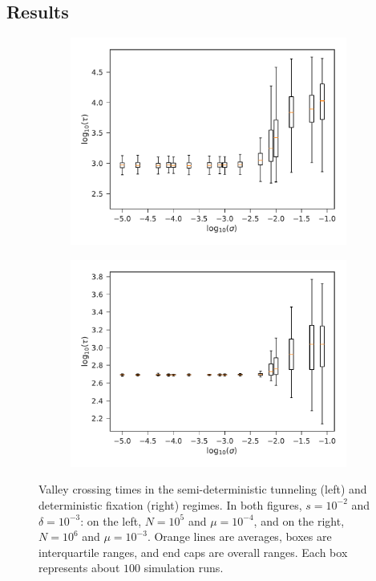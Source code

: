 \documentclass[rmp]{revtex4}
\begin{document}
\begin{spacing}{1.5}
\section*{Results}

\begin{figure}
\begin{subfigure}[b]{0.4\textwidth}
\includegraphics[width=\textwidth]{Figures/det_tunnel.pdf}
\end{subfigure}
\begin{subfigure}[b]{0.4\textwidth}
\includegraphics[width=\textwidth]{Figures/det_fix.pdf}
\end{subfigure}
\caption{Valley crossing times in the semi-deterministic tunneling (left) and deterministic fixation (right) regimes. In both figures, $s = 10^{-2}$ and $\delta = 10^{-3}$: on the left, $N = 10^5$ and $\mu = 10^{-4}$, and on the right, $N = 10^6$ and $\mu = 10^{-3}$. Orange lines are averages, boxes are interquartile ranges, and end caps are overall ranges. Each box represents about $100$ simulation runs.}
\label{fig:deterministic}
\end{figure}



\end{spacing}
\end{document}
